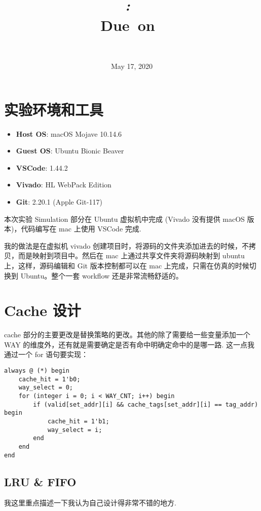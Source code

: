 \documentclass{article}
\title{
  \vspace{2in}
  \textbf{\reportMainTitle}\\
  \vspace{0.2in}
  \Large\textit{\reportClass:\ \reportTitle}\\
  \vspace{0.1in}
  \normalsize\vspace{0.1in}\small{Due\ on\ \reportDueTime}\\
  \vspace{3in}
}
\author{\reportAuthorName \\ \reportStudentNo}
\date{May 17, 2020}
\begin{document}
\maketitle

\pagebreak

\tableofcontents\label{toc}

\pagebreak

\newpage

\section{实验环境和工具}
\begin{itemize}
  \item
    \textbf{Host OS}: macOS Mojave 10.14.6
  \item
    \textbf{Guest OS}: Ubuntu Bionic Beaver
  \item
    \textbf{VSCode}: 1.44.2
  \item
    \textbf{Vivado}: HL WebPack Edition
  \item
    \textbf{Git}: 2.20.1 (Apple Git-117)
\end{itemize}
本次实验 Simulation 部分在 Ubuntu 虚拟机中完成 (Vivado 没有提供 macOS 版本)，代码编写在 mac 上使用 VSCode 完成.

我的做法是在虚拟机 vivado 创建项目时，将源码的文件夹添加进去的时候，不拷贝，而是映射到项目中。然后在 mac 上通过共享文件夹将源码映射到 ubuntu 上，这样，源码编辑和 Git 版本控制都可以在 mac 上完成，只需在仿真的时候切换到 Ubuntu。整个一套 workflow 还是非常流畅舒适的。

\section{Cache 设计}

cache 部分的主要更改是替换策略的更改。其他的除了需要给一些变量添加一个 WAY 的维度外，还有就是需要确定是否有命中明确定命中的是哪一路. 这一点我通过一个 for 语句要实现：
\begin{verbatim}
always @ (*) begin
    cache_hit = 1'b0;
    way_select = 0;
    for (integer i = 0; i < WAY_CNT; i++) begin
        if (valid[set_addr][i] && cache_tags[set_addr][i] == tag_addr) begin
            cache_hit = 1'b1;
            way_select = i;
        end
    end
end
\end{verbatim}

\subsection{LRU \& FIFO}
\label{impl:lru}
我这里重点描述一下我认为自己设计得非常不错的地方.
\end{document}
